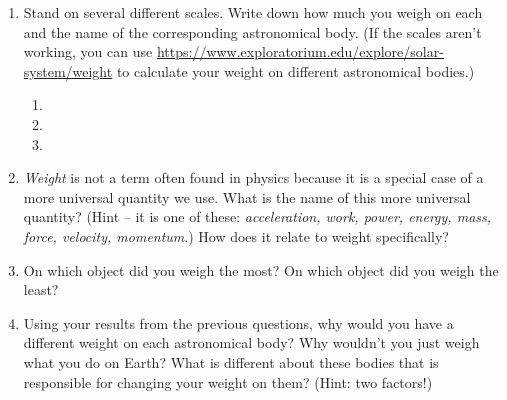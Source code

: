 \documentclass[12pt]{article}
\begin{document}
\begin{enumerate}
\item Stand on several different scales.  Write down how much you weigh on each and the name of the corresponding astronomical body.  (If the scales aren't working, you can use \url{https://www.exploratorium.edu/explore/solar-system/weight} to calculate your weight on different astronomical bodies.)

\begin{enumerate}
\item

\item
\vspace{.2in}

\item
\vspace{.2in}
\end{enumerate}

\item \emph{Weight} is not a term often found in physics because it is a special case of a more universal quantity we use.  What is the name of this more universal
quantity?  (Hint -- it is one of these: \emph{acceleration, work, power, energy, mass, force, velocity, momentum}.)  How does it relate to weight specifically?
\vspace{1.25in}

\item On which object did you weigh the most?  On which object did you weigh the least?  
\vspace{0.5in}

\item Using your results from the previous questions, why would you have a different weight on each astronomical body?  Why wouldn't you just weigh what you do on Earth?  What is different about 
these bodies that is responsible for changing your weight on them?  (Hint: two 
factors!)
\vspace{1.75in}


\end{enumerate}
\end{document}

